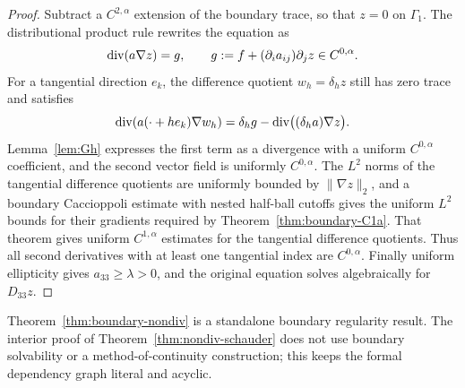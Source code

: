 \begin{proof}
Subtract a $C^{2,\alpha}$ extension of the boundary trace, so that $z=0$ on
$\Gamma_1$.  The distributional product rule rewrites the equation as
\[
  \operatorname{div}(a\nabla z)=g,
  \qquad g:=f+(\partial_i a_{ij})\partial_jz\in C^{0,\alpha}.
\]
For a tangential direction $e_k$, the difference quotient $w_h=\delta_hz$
still has zero trace and satisfies
\[
  \operatorname{div}(a(\cdot+he_k)\nabla w_h)
  =\delta_hg-\operatorname{div}\bigl((\delta_ha)\nabla z\bigr).
\]
Lemma~\ref{lem:Gh} expresses the first term as a divergence with a uniform
$C^{0,\alpha}$ coefficient, and the second vector field is uniformly
$C^{0,\alpha}$.  The $L^2$ norms of the tangential difference quotients are
uniformly bounded by $\|\nabla z\|_2$, and a boundary Caccioppoli estimate
with nested half-ball cutoffs gives the uniform $L^2$ bounds for their
gradients required by Theorem~\ref{thm:boundary-C1a}.  That theorem gives uniform
$C^{1,\alpha}$ estimates for the tangential difference quotients.  Thus all
second derivatives with at least one tangential index are $C^{0,\alpha}$.
Finally uniform ellipticity gives $a_{33}\ge\lambda>0$, and the original
equation solves algebraically for $D_{33}z$.
\end{proof}

\begin{fnote}\label{fnote:boundary-nondiv-status}
Theorem~\ref{thm:boundary-nondiv} is a standalone boundary regularity result.
The interior proof of Theorem~\ref{thm:nondiv-schauder} does not use boundary
solvability or a method-of-continuity construction; this keeps the formal
dependency graph literal and acyclic.
\end{fnote}

